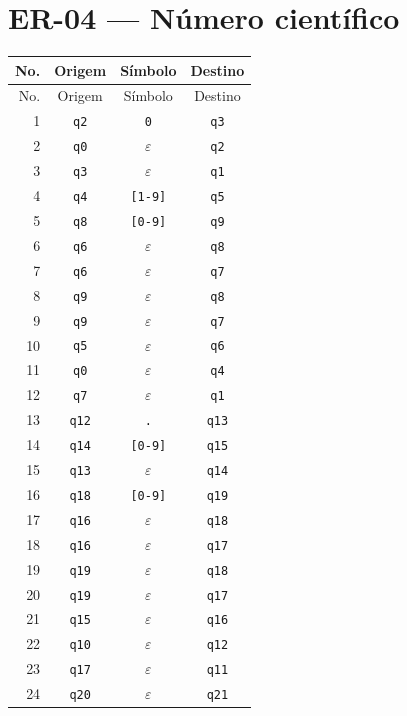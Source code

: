 \section{ER-04 --- Número científico}
\small
\begin{longtable}{|r|c|c|c|}
\toprule
No. & Origem & Símbolo & Destino \\
\midrule
\endfirsthead
\toprule
No. & Origem & Símbolo & Destino \\
\midrule
\endhead
1 & \texttt{q2} & \texttt{0} & \texttt{q3} \\
2 & \texttt{q0} & $\varepsilon$ & \texttt{q2} \\
3 & \texttt{q3} & $\varepsilon$ & \texttt{q1} \\
4 & \texttt{q4} & \texttt{[1-9]} & \texttt{q5} \\
5 & \texttt{q8} & \texttt{[0-9]} & \texttt{q9} \\
6 & \texttt{q6} & $\varepsilon$ & \texttt{q8} \\
7 & \texttt{q6} & $\varepsilon$ & \texttt{q7} \\
8 & \texttt{q9} & $\varepsilon$ & \texttt{q8} \\
9 & \texttt{q9} & $\varepsilon$ & \texttt{q7} \\
10 & \texttt{q5} & $\varepsilon$ & \texttt{q6} \\
11 & \texttt{q0} & $\varepsilon$ & \texttt{q4} \\
12 & \texttt{q7} & $\varepsilon$ & \texttt{q1} \\
13 & \texttt{q12} & \texttt{.} & \texttt{q13} \\
14 & \texttt{q14} & \texttt{[0-9]} & \texttt{q15} \\
15 & \texttt{q13} & $\varepsilon$ & \texttt{q14} \\
16 & \texttt{q18} & \texttt{[0-9]} & \texttt{q19} \\
17 & \texttt{q16} & $\varepsilon$ & \texttt{q18} \\
18 & \texttt{q16} & $\varepsilon$ & \texttt{q17} \\
19 & \texttt{q19} & $\varepsilon$ & \texttt{q18} \\
20 & \texttt{q19} & $\varepsilon$ & \texttt{q17} \\
21 & \texttt{q15} & $\varepsilon$ & \texttt{q16} \\
22 & \texttt{q10} & $\varepsilon$ & \texttt{q12} \\
23 & \texttt{q17} & $\varepsilon$ & \texttt{q11} \\
24 & \texttt{q20} & $\varepsilon$ & \texttt{q21} \\

\end{longtable}
